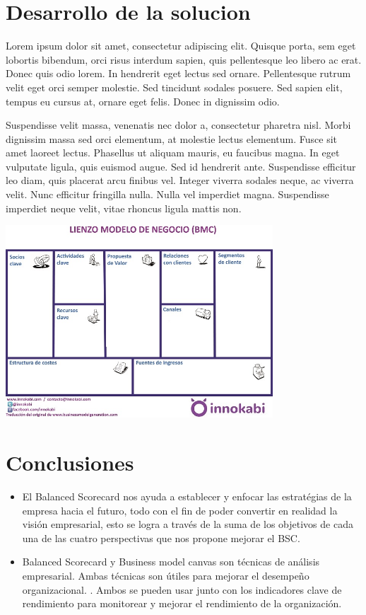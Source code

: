 \documentclass[%
 reprint,
 amsmath,amssymb,
 aps,
]{revtex4-1}
\begin{document}
\section {Desarrollo de la solucion}

Lorem ipsum dolor sit amet, consectetur adipiscing elit. Quisque porta, sem eget lobortis bibendum, orci risus interdum sapien, quis pellentesque leo libero ac erat. Donec quis odio lorem. In hendrerit eget lectus sed ornare. Pellentesque rutrum velit eget orci semper molestie. Sed tincidunt sodales posuere. Sed sapien elit, tempus eu cursus at, ornare eget felis. Donec in dignissim odio.

Suspendisse velit massa, venenatis nec dolor a, consectetur pharetra nisl. Morbi dignissim massa sed orci elementum, at molestie lectus elementum. Fusce sit amet laoreet lectus. Phasellus ut aliquam mauris, eu faucibus magna. In eget vulputate ligula, quis euismod augue. Sed id hendrerit ante. Suspendisse efficitur leo diam, quis placerat arcu finibus vel. Integer viverra sodales neque, ac viverra velit. Nunc efficitur fringilla nulla. Nulla vel imperdiet magna. Suspendisse imperdiet neque velit, vitae rhoncus ligula mattis non.
\begin{center}
\includegraphics[width=10cm]{./Imagenes/imagen4}
\end{center}

\section{Conclusiones}

\begin{itemize}
\item El Balanced Scorecard nos ayuda a establecer y enfocar las estratégias de la empresa hacia el futuro, todo con el fin de poder convertir en realidad la visión empresarial, esto se logra a través de la suma de los objetivos de cada una de las cuatro perspectivas que nos propone mejorar el BSC.

\item Balanced Scorecard y Business model canvas son técnicas de análisis empresarial. Ambas técnicas son útiles para mejorar el desempeño organizacional. . Ambos se pueden usar junto con los indicadores clave de rendimiento para monitorear y mejorar el rendimiento de la organización. 

\end{itemize}


%
%
\end{document}
